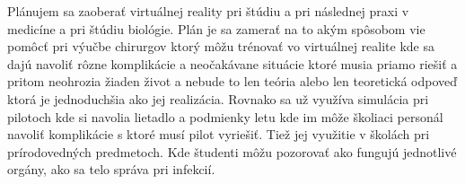 Plánujem sa zaoberať virtuálnej reality pri štúdiu a pri následnej praxi v medicíne a pri štúdiu biológie. Plán je sa zamerať na to akým spôsobom vie pomôcť pri výučbe chirurgov ktorý môžu trénovať vo virtuálnej realite kde sa dajú navoliť rôzne komplikácie a neočakávane situácie ktoré musia priamo riešiť a pritom neohrozia žiaden život a nebude to len teória alebo len teoretická odpoveď ktorá je jednoduchšia ako jej realizácia. Rovnako sa už využíva simulácia pri pilotoch kde si navolia lietadlo a podmienky letu kde im môže školiaci personál navoliť komplikácie s ktoré musí pilot vyriešiť. Tiež jej využitie v školách pri prírodovedných predmetoch. Kde študenti môžu pozorovať ako fungujú jednotlivé orgány, ako sa telo správa pri infekcií.